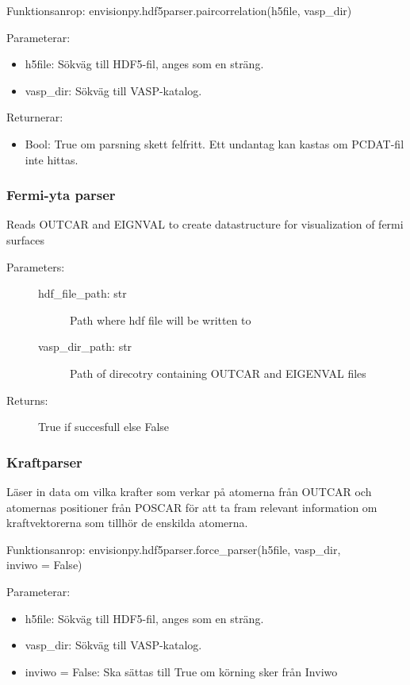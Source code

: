 \documentclass[10pt,oneside,swedish]{article}
\providecommand{\tightlist}{%
  \setlength{\itemsep}{0pt}\setlength{\parskip}{0pt}}
\begin{document}
Funktionsanrop: envisionpy.hdf5parser.paircorrelation(h5file, vasp\_dir)

Parameterar:

\begin{itemize}
\tightlist
\item
  h5file: Sökväg till HDF5-fil, anges som en sträng.
\item
  vasp\_dir: Sökväg till VASP-katalog.
\end{itemize}

Returnerar:

\begin{itemize}
\tightlist
\item
  Bool: True om parsning skett felfritt. Ett undantag kan kastas om
  PCDAT-fil inte hittas.
\end{itemize}

\subsubsection{Fermi-yta parser}\label{fermi-yta-parser}

Reads OUTCAR and EIGNVAL to create datastructure for visualization of
fermi surfaces

\begin{description}
\item[Parameters:]
\begin{description}
\item[hdf\_file\_path: str]
Path where hdf file will be written to
\item[vasp\_dir\_path: str]
Path of direcotry containing OUTCAR and EIGENVAL files
\end{description}
\item[Returns:]
True if succesfull else False
\end{description}

\subsubsection{Kraftparser}\label{Kraftparser}
Läser in data om vilka krafter som verkar på atomerna från OUTCAR och atomernas positioner från POSCAR för att ta fram relevant information om kraftvektorerna som tillhör de enskilda atomerna.

Funktionsanrop: envisionpy.hdf5parser.force\_parser(h5file, vasp\_dir, \\ inviwo = False)

Parameterar:

\begin{itemize}
\tightlist
\item
  h5file: Sökväg till HDF5-fil, anges som en sträng.
\item
  vasp\_dir: Sökväg till VASP-katalog.
\item
  inviwo = False: Ska sättas till True om körning sker från Inviwo
\end{itemize}
\end{document}

